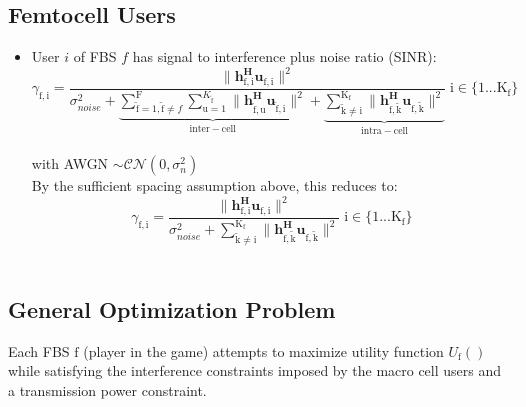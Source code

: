 \documentclass[12pt,a4paper]{report}
\begin{document}
\subsection{Femtocell Users}
\begin{itemize}

\item User $i$ of FBS $f$ has signal to interference plus noise ratio (SINR):
	\begin{equation*}
	\gamma_{\mathrm{f,i}} = \frac{\|\mathbf{h^H_{\mathrm{f,i}}u_{\mathrm{f,i}}}\|^2}
	{\sigma^2_{noise}   +
	\underbrace{
	 \sum_{\mathrm{\tilde{f}}=1,\mathrm{\tilde{f}}\neq f}^{\mathrm{F}} \sum_{\mathrm{u=1}}^{K_{\mathrm{\tilde{f}}}}
	\|\mathbf{h^H_{\mathrm{\tilde{f},u}}u_{\mathrm{\tilde{f},i}}}\|^2}_{\mathrm{inter-cell}}
	 + 
	 \underbrace{
	 \sum_{\mathrm{\tilde{k}\neq i}}^{\mathrm{K_f}}
	 \|\mathbf{h^H_{\mathrm{f,\tilde{k}}}u_{\mathrm{f,\tilde{k}}}}\|^2}_{\mathrm{intra-cell}}}
	  \; \mathrm{i \in \{1 ... K_f\}}\end{equation*}
\\
with AWGN $\sim \mathcal{CN}(0,\sigma^2_n)$
\\

By the sufficient spacing assumption above, this reduces to:
	\begin{equation*}
	\gamma_{\mathrm{f,i}} = \frac{\|\mathbf{h^H_{\mathrm{f,i}}u_{\mathrm{f,i}}}\|^2}
	{\sigma^2_{noise} 
	 + \sum_{\mathrm{\tilde{k}\neq i}}^{\mathrm{K_f}}
	  \|\mathbf{h^H_{\mathrm{f,\tilde{k}}}u_{\mathrm{f,\tilde{k}}}}\|^2}
	  \; \mathrm{i \in \{1 ... K_f\}}
	\end{equation*}
\\


\end{itemize}





\subsection{General Optimization Problem}\label{genproblem}

Each FBS $\text{f}$ (player in the game) attempts to maximize utility function $U_{\text{f}}()$ while satisfying the interference constraints imposed by the macro cell users and a transmission power constraint. 
\par
\end{document}
